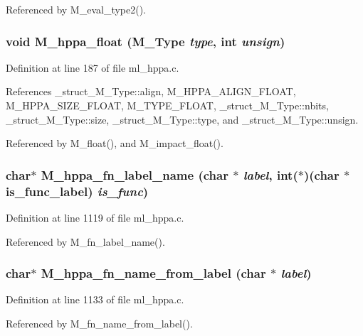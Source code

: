 Referenced by M\_\-eval\_\-type2().
\subsubsection{\setlength{\rightskip}{0pt plus 5cm}void M\_\-hppa\_\-float (\bf{M\_\-Type} {\em type}, int {\em unsign})}\label{ml__hppa_8c_a602a3496ec13df4220bd2a7fc6a8167}




Definition at line 187 of file ml\_\-hppa.c.

References \_\-struct\_\-M\_\-Type::align, M\_\-HPPA\_\-ALIGN\_\-FLOAT, M\_\-HPPA\_\-SIZE\_\-FLOAT, M\_\-TYPE\_\-FLOAT, \_\-struct\_\-M\_\-Type::nbits, \_\-struct\_\-M\_\-Type::size, \_\-struct\_\-M\_\-Type::type, and \_\-struct\_\-M\_\-Type::unsign.

Referenced by M\_\-float(), and M\_\-impact\_\-float().
\subsubsection{\setlength{\rightskip}{0pt plus 5cm}char$\ast$ M\_\-hppa\_\-fn\_\-label\_\-name (char $\ast$ {\em label}, int($\ast$)(char $\ast$is\_\-func\_\-label) {\em is\_\-func})}\label{ml__hppa_8c_9220a2944c316bd79328621e28405ea4}




Definition at line 1119 of file ml\_\-hppa.c.

Referenced by M\_\-fn\_\-label\_\-name().
\subsubsection{\setlength{\rightskip}{0pt plus 5cm}char$\ast$ M\_\-hppa\_\-fn\_\-name\_\-from\_\-label (char $\ast$ {\em label})}\label{ml__hppa_8c_f2960456940ae7a768be5669e2770171}




Definition at line 1133 of file ml\_\-hppa.c.

Referenced by M\_\-fn\_\-name\_\-from\_\-label().
